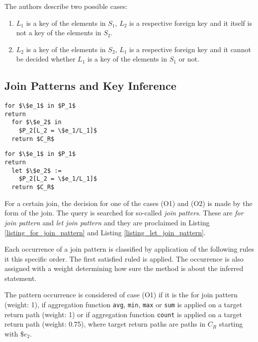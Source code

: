 The authors describe two possible cases:

\begin{enumerate}
\renewcommand{\theenumi}{(O\arabic{enumi})}
\renewcommand{\labelenumi}{\theenumi}
\item $L_1$ is a key of the elements in $S_1$, $L_2$ is a respective foreign key and it itself is not a key of the elements in $S_2$.
\item $L_2$ is a key of the elements in $S_2$, $L_1$ is a respective foreign key and it cannot be decided whether $L_1$ is a key of the elements in $S_1$ or not.
\end{enumerate}

\subsection{Join Patterns and Key Inference}
\begin{lstlisting}[mathescape, float, caption=For join pattern., frame=single, label=listing_for_join_pattern]
for $\$e_1$ in $P_1$
return
  for $\$e_2$ in
    $P_2[L_2 = \$e_1/L_1]$
  return $C_R$
\end{lstlisting}

\begin{lstlisting}[mathescape, float, caption=Let join pattern., frame=single, label=listing_let_join_pattern]
for $\$e_1$ in $P_1$
return
  let $\$e_2$ :=
    $P_2[L_2 = \$e_1/L_1]$
  return $C_R$
\end{lstlisting}

For a certain join, the decision for one of the cases (O1) and (O2) is made by the form of the join. The query is searched for so-called \emph{join patters}. These are \emph{for join pattern} and \emph{let join pattern} and they are proclaimed in Listing \ref{listing_for_join_pattern} and Listing \ref{listing_let_join_pattern}.

Each occurrence of a join pattern is classified by application of the following rules it this specific order. The first satisfied ruled is applied. The occurrence is also assigned with a weight determining how sure the method is about the inferred statement.

The pattern occurrence is considered of case (O1) if it is the for join pattern (weight: 1), if aggregation function \texttt{avg}, \texttt{min}, \texttt{max} or \texttt{sum} is applied on a target return path (weight: 1) or if aggregation function \texttt{count} is applied on a target return path (weight: 0.75), where target return paths are paths in $C_R$ starting with $\$e_2$.

